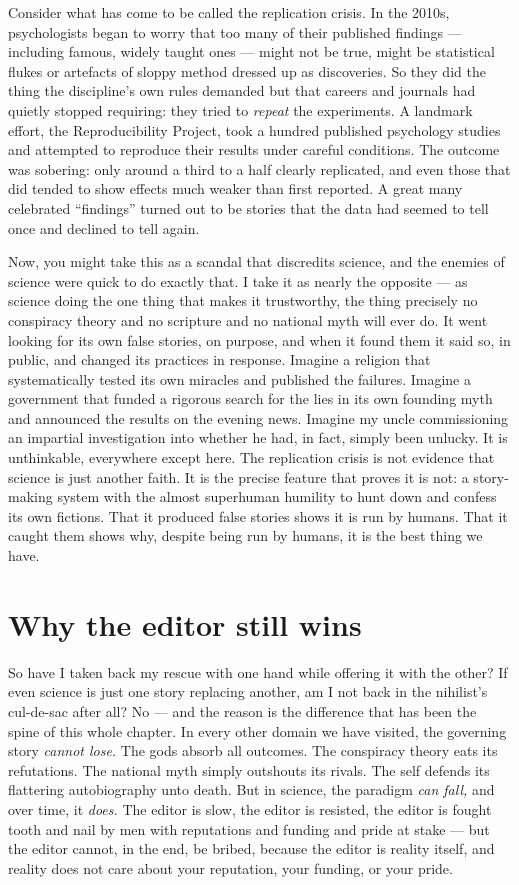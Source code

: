 Consider what has come to be called the replication crisis. In the 2010s, psychologists began to worry that too many of their published findings — including famous, widely taught ones — might not be true, might be statistical flukes or artefacts of sloppy method dressed up as discoveries. So they did the thing the discipline's own rules demanded but that careers and journals had quietly stopped requiring: they tried to \emph{repeat} the experiments. A landmark effort, the Reproducibility Project, took a hundred published psychology studies and attempted to reproduce their results under careful conditions. The outcome was sobering: only around a third to a half clearly replicated, and even those that did tended to show effects much weaker than first reported. A great many celebrated ``findings'' turned out to be stories that the data had seemed to tell once and declined to tell again.

Now, you might take this as a scandal that discredits science, and the enemies of science were quick to do exactly that. I take it as nearly the opposite — as science doing the one thing that makes it trustworthy, the thing precisely no conspiracy theory and no scripture and no national myth will ever do. It went looking for its own false stories, on purpose, and when it found them it said so, in public, and changed its practices in response. Imagine a religion that systematically tested its own miracles and published the failures. Imagine a government that funded a rigorous search for the lies in its own founding myth and announced the results on the evening news. Imagine my uncle commissioning an impartial investigation into whether he had, in fact, simply been unlucky. It is unthinkable, everywhere except here. The replication crisis is not evidence that science is just another faith. It is the precise feature that proves it is not: a story-making system with the almost superhuman humility to hunt down and confess its own fictions. That it produced false stories shows it is run by humans. That it caught them shows why, despite being run by humans, it is the best thing we have.

\section*{Why the editor still wins}

So have I taken back my rescue with one hand while offering it with the other? If even science is just one story replacing another, am I not back in the nihilist's cul-de-sac after all? No — and the reason is the difference that has been the spine of this whole chapter. In every other domain we have visited, the governing story \emph{cannot lose.} The gods absorb all outcomes. The conspiracy theory eats its refutations. The national myth simply outshouts its rivals. The self defends its flattering autobiography unto death. But in science, the paradigm \emph{can fall,} and over time, it \emph{does.} The editor is slow, the editor is resisted, the editor is fought tooth and nail by men with reputations and funding and pride at stake — but the editor cannot, in the end, be bribed, because the editor is reality itself, and reality does not care about your reputation, your funding, or your pride.


